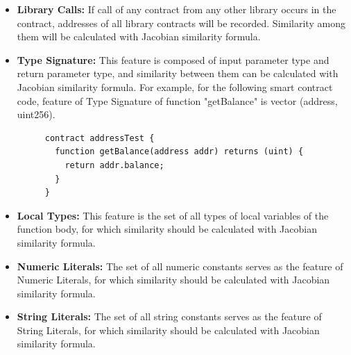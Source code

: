\begin{itemize}
	\item \textbf{Library Calls:}  If call of any contract from any other library occurs in the contract, addresses of all library contracts will be recorded. Similarity among them will be calculated with Jacobian similarity formula.
	
	\item \textbf{Type Signature:} This feature is composed of input parameter type and return parameter type, and similarity between them can be calculated with Jacobian similarity formula. For example, for the following smart contract code, feature of Type Signature of function "getBalance" is vector (address, uint256). \\
	
	\begin{figure}[h]
  	\centering
  	\begin{minipage}{.7\linewidth}
	\begin{lstlisting}[frame=single]
contract addressTest {
  function getBalance(address addr) returns (uint) {
  	return addr.balance;
  }
}
	\end{lstlisting}
  	\end{minipage}
	\end{figure}

	\item \textbf{Local Types:} This feature is the set of all types of local variables of the function body, for which similarity should be calculated with Jacobian similarity formula.
	
	\item \textbf{Numeric Literals:} The set of all numeric constants serves as the feature of Numeric Literals, for which similarity should be calculated with Jacobian similarity formula.
	
	\item \textbf{String Literals:} The set of all string constants serves as the feature of String Literals, for which similarity should be calculated with Jacobian similarity formula.
\end{itemize}


